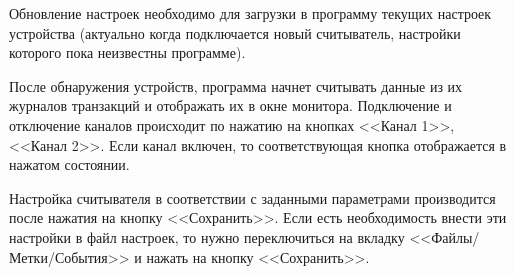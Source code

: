Обновление настроек необходимо для загрузки в программу текущих настроек устройства 
(актуально когда подключается новый считыватель, настройки которого пока неизвестны программе).

После обнаружения устройств, программа начнет считывать данные из их журналов транзакций и 
отображать их в окне монитора. Подключение и отключение каналов происходит по нажатию на кнопках <<Канал 1>>, <<Канал 2>>.
Если канал включен, то соответствующая кнопка отображается в нажатом состоянии.

Настройка считывателя в соответствии с заданными параметрами производится после нажатия на кнопку <<Сохранить>>.
Если есть необходимость внести эти настройки в файл настроек, то нужно переключиться на вкладку <<Файлы/Метки/События>>
 и нажать на кнопку <<Сохранить>>.

